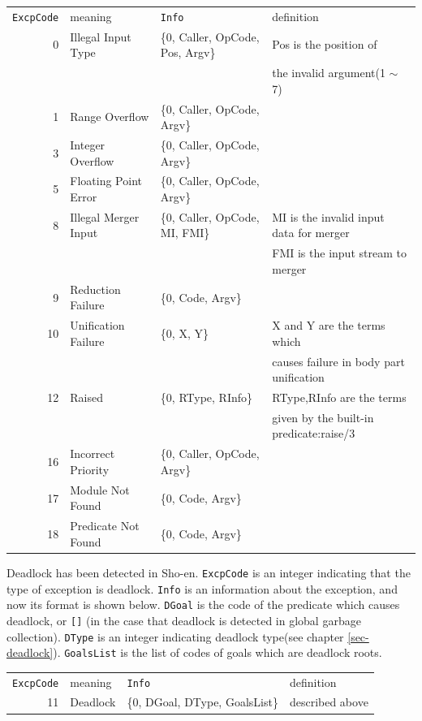 \begin{itemize}
\begin{tabular} {rl@{\ ::\ }ll}
\verb|ExcpCode| & meaning & \verb|Info| & definition \\
0 & Illegal Input Type & \{0, Caller, OpCode, Pos, Argv\}
& Pos is the position of \\
 & & & the invalid argument(1 $\sim$ 7)\\
1 & Range Overflow & \{0, Caller, OpCode, Argv\} & \\
3 & Integer Overflow & \{0, Caller, OpCode, Argv\} & \\
5 & Floating Point Error & \{0, Caller, OpCode, Argv\} & \\
8 & Illegal Merger Input & \{0, Caller, OpCode, MI, FMI\}
& MI is the invalid input data for merger \\
 & & & FMI is the input stream to merger \\
9 & Reduction Failure & \{0, Code, Argv\} & \\
10 & Unification Failure & \{0, X, Y\}
& X and Y are the terms which \\
 & & & causes failure in body part unification \\
12 & Raised & \{0, RType, RInfo\}
& RType,RInfo are the terms \\
 & & &given by the built-in predicate:raise/3 \\
16 & Incorrect Priority & \{0, Caller, OpCode, Argv\} & \\
17 & Module Not Found & \{0, Code, Argv\} & \\
18 & Predicate Not Found & \{0, Code, Argv\} & \\
\end{tabular}

Deadlock has been detected in Sho-en. 
\verb|ExcpCode| is an integer indicating 
that the type of exception is deadlock.
\verb|Info| is an information about the exception, 
and now its format is shown below.
\verb|DGoal| is the code of the predicate which causes deadlock, or \verb|[]|
(in the case that deadlock is detected in global garbage collection).
\verb|DType| is an integer indicating
deadlock type(see chapter \ref{sec-deadlock}).
\verb|GoalsList| is the list of codes of goals which are deadlock roots.

\begin{tabular} {rl@{\ ::\ }ll}
\verb|ExcpCode| & meaning & \verb|Info| & definition \\
11 & Deadlock & \{0, DGoal, DType, GoalsList\} & described above \\
\end{tabular}

\end{itemize}

